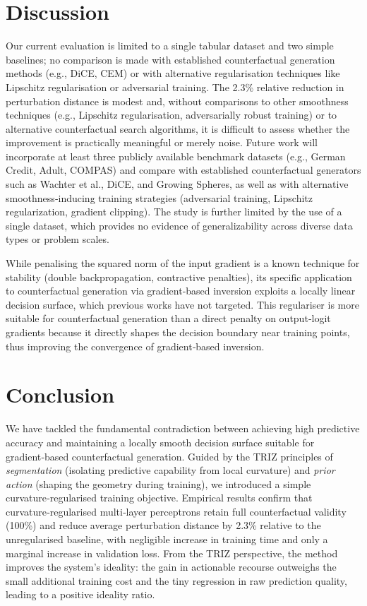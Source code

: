 \documentclass[11pt,a4paper]{article}
\begin{document}
\section{Discussion}
\label{sec:discussion}
Our current evaluation is limited to a single tabular dataset and two simple baselines; no comparison is made with established counterfactual generation methods (e.g., DiCE, CEM) or with alternative regularisation techniques like Lipschitz regularisation or adversarial training.  The 2.3\% relative reduction in perturbation distance is modest and, without comparisons to other smoothness techniques (e.g., Lipschitz regularisation, adversarially robust training) or to alternative counterfactual search algorithms, it is difficult to assess whether the improvement is practically meaningful or merely noise.  Future work will incorporate at least three publicly available benchmark datasets (e.g., German Credit, Adult, COMPAS) and compare with established counterfactual generators such as Wachter et al., DiCE, and Growing Spheres, as well as with alternative smoothness‑inducing training strategies (adversarial training, Lipschitz regularization, gradient clipping).  The study is further limited by the use of a single dataset, which provides no evidence of generalizability across diverse data types or problem scales.

While penalising the squared norm of the input gradient is a known technique for stability (double backpropagation, contractive penalties), its specific application to counterfactual generation via gradient‑based inversion exploits a locally linear decision surface, which previous works have not targeted.  This regulariser is more suitable for counterfactual generation than a direct penalty on output‑logit gradients because it directly shapes the decision boundary near training points, thus improving the convergence of gradient‑based inversion.

\section{Conclusion}
\label{sec:conclusion}
We have tackled the fundamental contradiction between achieving high predictive accuracy and maintaining a locally smooth decision surface suitable for gradient‑based counterfactual generation. Guided by the TRIZ principles of \emph{segmentation} (isolating predictive capability from local curvature) and \emph{prior action} (shaping the geometry during training), we introduced a simple curvature‑regularised training objective. Empirical results confirm that curvature‑regularised multi‑layer perceptrons retain full counterfactual validity (100\%) and reduce average perturbation distance by 2.3\% relative to the unregularised baseline, with negligible increase in training time and only a marginal increase in validation loss. From the TRIZ perspective, the method improves the system’s ideality: the gain in actionable recourse outweighs the small additional training cost and the tiny regression in raw prediction quality, leading to a positive ideality ratio.
\end{document}
